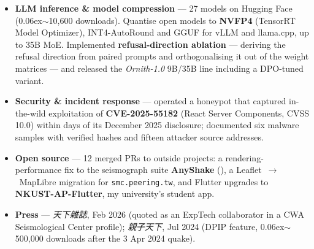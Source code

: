 \documentclass{resume}
\begin{document}
\begin{itemize}
  \item \textbf{LLM inference \& model compression} --- 27 models on Hugging Face
    ({\raise0.06ex\hbox{$\sim$}}10,600 downloads). Quantise open models to \textbf{NVFP4} (TensorRT Model
    Optimizer), INT4-AutoRound and GGUF for vLLM and llama.cpp, up to 35B MoE. Implemented
    \textbf{refusal-direction ablation} --- deriving the refusal direction from paired prompts and
    orthogonalising it out of the weight matrices --- and released the \emph{Ornith-1.0} 9B/35B line
    including a DPO-tuned variant.
  \item \textbf{Security \& incident response} --- operated a honeypot that captured in-the-wild
    exploitation of \textbf{CVE-2025-55182} (React Server Components, CVSS 10.0) within days of its
    December 2025 disclosure; documented six malware samples with verified hashes and fifteen
    attacker source addresses.
  \item \textbf{Open source} --- 12 merged PRs to outside projects: a rendering-performance fix to the
    seismograph suite \textbf{AnyShake}
    (), a
    Leaflet~$\rightarrow$~MapLibre migration for \texttt{smc.peering.tw}, and Flutter upgrades to
    \textbf{NKUST-AP-Flutter}, my university's student app.
  \item \textbf{Press} --- \emph{天下雜誌}, Feb 2026 (quoted as an ExpTech collaborator in a CWA
    Seismological Center profile); \emph{親子天下}, Jul 2024 (DPIP feature,
    {\raise0.06ex\hbox{$\sim$}}500,000 downloads after the 3 Apr 2024 quake).
\end{itemize}
\end{document}
